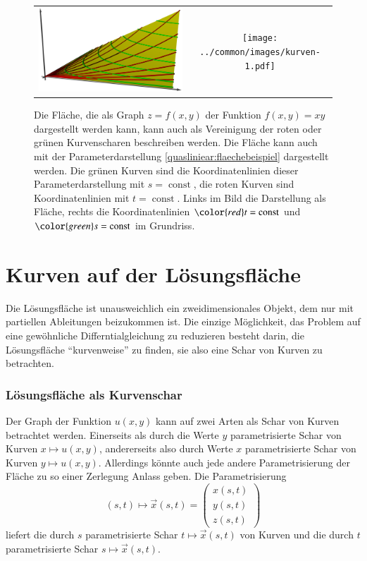 %
%
%
\begin{figure}
\centering
\begin{tabular}{cc}
\includegraphics[width=0.6\hsize]{../common/3d/surface.jpg}&%
\texttt{[image: ../common/images/kurven-1.pdf]}
\end{tabular}
\caption{Die Fläche, die als Graph $z=f(x,y)$ der Funktion $f(x,y)=xy$
dargestellt werden kann, kann auch als Vereinigung der roten oder grünen
Kurvenscharen beschreiben werden.
Die Fläche kann auch mit der Parameterdarstellung
\eqref{quasliniear:flaechebeispiel}
dargestellt werden.
Die grünen Kurven sind die Koordinatenlinien dieser Parameterdarstellung
mit $s=\operatorname{const}$,
die roten Kurven sind Koordinatenlinien mit $t=\operatorname{const}$.
Links im Bild die Darstellung als Fläche, rechts die Koordinatenlinien
${\color{red}t}=\operatorname{const}$
und
${\color{green}s}=\operatorname{const}$
im Grundriss.
\label{quasilinear:flaechenalskurven}
}
\end{figure}

\section{Kurven auf der Lösungsfläche}
Die Lösungsfläche ist unausweichlich ein zweidimensionales
Objekt, dem nur mit partiellen Ableitungen beizukommen ist.
Die einzige Möglichkeit, das Problem auf eine gewöhnliche
Differntialgleichung zu reduzieren besteht darin, die Lösungsfläche
``kurvenweise'' zu finden, sie also eine Schar von Kurven
zu betrachten.

\subsubsection{Lösungsfläche als Kurvenschar}
Der Graph der Funktion $u(x,y)$ kann auf zwei Arten als Schar von
Kurven betrachtet werden.
Einerseits als durch die Werte $y$
parametrisierte Schar von Kurven $x\mapsto u(x,y)$, andererseits
also durch Werte $x$ parametrisierte Schar von Kurven $y\mapsto u(x,y)$.
Allerdings könnte auch jede andere Parametrisierung der Fläche
zu so einer Zerlegung Anlass geben. Die Parametrisierung
\begin{equation}
(s,t)\mapsto \vec x(s,t)
=
\begin{pmatrix}x(s,t)\\y(s,t)\\z(s,t)\end{pmatrix}
\label{quasilinear:kurvenschar}
\end{equation}
liefert die durch $s$ parametrisierte Schar $t\mapsto \vec x(s,t)$
von Kurven und die durch $t$ parametrisierte Schar $s\mapsto\vec x(s,t)$.

